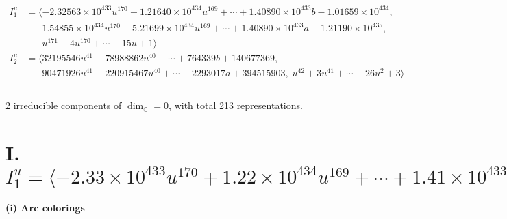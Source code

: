\documentclass[1p]{elsarticle_modified}
\theoremstyle{definition}
\begin{document}
\begin{align*}
I^u_{1}&=\langle 
-2.32563\times10^{433} u^{170}+1.21640\times10^{434} u^{169}+\cdots+1.40890\times10^{433} b-1.01659\times10^{434},\\
\phantom{I^u_{1}}&\phantom{= \langle  }1.54855\times10^{434} u^{170}-5.21699\times10^{434} u^{169}+\cdots+1.40890\times10^{433} a-1.21190\times10^{435},\\
\phantom{I^u_{1}}&\phantom{= \langle  }u^{171}-4 u^{170}+\cdots-15 u+1\rangle \\
I^u_{2}&=\langle 
32195546 u^{41}+78988862 u^{40}+\cdots+764339 b+140677369,\\
\phantom{I^u_{2}}&\phantom{= \langle  }90471926 u^{41}+220915467 u^{40}+\cdots+2293017 a+394515903,\;u^{42}+3 u^{41}+\cdots-26 u^2+3\rangle \\
\\
\end{align*}
\raggedright * 2 irreducible components of $\dim_{\mathbb{C}}=0$, with total 213 representations.\\
\newpage
\renewcommand{\arraystretch}{1}
\centering \section*{I. $I^u_{1}= \langle -2.33\times10^{433} u^{170}+1.22\times10^{434} u^{169}+\cdots+1.41\times10^{433} b-1.02\times10^{434},\;1.55\times10^{434} u^{170}-5.22\times10^{434} u^{169}+\cdots+1.41\times10^{433} a-1.21\times10^{435},\;u^{171}-4 u^{170}+\cdots-15 u+1 \rangle$}
\flushleft \textbf{(i) Arc colorings}\\
\end{document}
